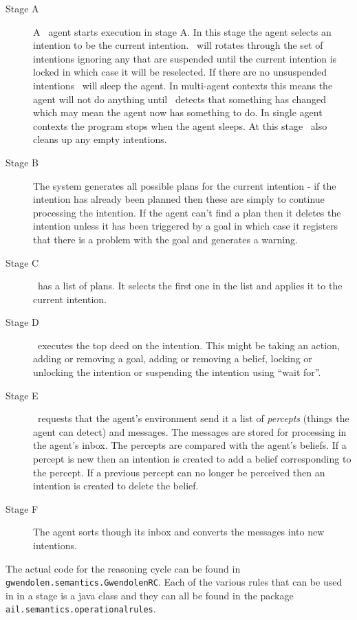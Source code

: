 \documentclass[a4]{article}
\begin{document}
\begin{description}
\item[Stage A]
A \gwendolen\ agent starts execution in stage A.  In this stage the agent selects an intention to be the current intention.  \gwendolen\ will rotates through the set of intentions ignoring any that are suspended until the current intention is locked in which case it will be reselected.  If there are no unsuspended intentions \gwendolen\ will sleep the agent.  In multi-agent contexts this means the agent will not do anything until \gwendolen\ detects that something has changed which may mean the agent now has something to do.  In single agent contexts the program stops when the agent sleeps.  At this stage \gwendolen\ also cleans up any empty intentions.
\item[Stage B]
The system generates all possible plans for the current intention - if the intention has already been planned then these are simply to continue processing the intention.  If the agent can't find a plan then it deletes the intention unless it has been triggered by a goal in which case it registers that there is a problem with the goal and generates a warning.
\item[Stage C]
\gwendolen\ has a list of plans.  It selects the first one in the list and applies it to the current intention.
\item[Stage D]
\gwendolen\ executes the top deed on the intention.  This might be taking an action, adding or removing a goal, adding or removing a belief, locking or unlocking the intention or suspending the intention using ``wait for''.
\item[Stage E]
\gwendolen\ requests that the agent's environment send it a list of \emph{percepts} (things the agent can detect) and messages.  The messages are stored for processing in the agent's inbox.  The percepts are compared with the agent's beliefs.  If a percept is new then an intention is created to add a belief corresponding to the percept.  If a previous percept can no longer be perceived then an intention is created to delete the belief.
\item[Stage F]
The agent sorts though its inbox and converts the messages into new intentions.
\end{description}

The actual code for the reasoning cycle can be found in \texttt{gwendolen.semantics.GwendolenRC}.  Each of the various rules that can be used in in a stage is a java class and they can all be found in the package \texttt{ail.semantics.operationalrules}.
\end{document}
